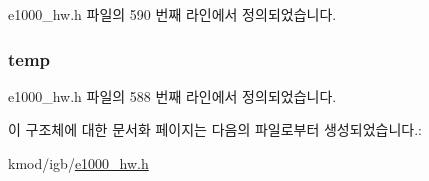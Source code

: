 e1000\+\_\+hw.\+h 파일의 590 번째 라인에서 정의되었습니다.

\subsubsection[{\texorpdfstring{temp}{temp}}]{ temp}\hypertarget{structe1000__thermal__diode__data_ae0825a9338b7ba9f7c2c39dd6870254d}{}\label{structe1000__thermal__diode__data_ae0825a9338b7ba9f7c2c39dd6870254d}


e1000\+\_\+hw.\+h 파일의 588 번째 라인에서 정의되었습니다.



이 구조체에 대한 문서화 페이지는 다음의 파일로부터 생성되었습니다.\+:\begin{DoxyCompactItemize}
\item 
kmod/igb/\hyperlink{kmod_2igb_2e1000__hw_8h}{e1000\+\_\+hw.\+h}\end{DoxyCompactItemize}
